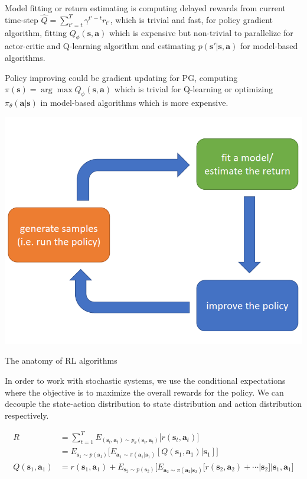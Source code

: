 \documentclass{tufte-handout}
\newcommand{\s}{\mathbf{s}}
\newcommand{\act}{\mathbf{a}}
\begin{document}
Model fitting or return estimating is computing delayed rewards from current time-step $\hat{Q}=\sum_{t'=t}^T \gamma ^{t'-t} r_{t'} $, which is trivial and fast, for policy gradient algorithm, fitting $Q_\phi(\s, \act) $ which is expensive but non-trivial to parallelize for actor-critic and Q-learning algorithm and estimating $p(\s' | \s, \act) $ for model-based algorithms.

Policy improving could be gradient updating for PG, computing $\pi(\s) = \arg \max Q_\phi (\s, \act)$ which is trivial for Q-learning or optimizing $\pi_\theta(\act | \s) $ in model-based algorithms which is more expensive.

\begin{marginfigure}
  \centering
  \includegraphics[width=\linewidth]{anatomy}
  \caption{The anatomy of RL algorithms}
  \label{fig:anatomy}
\end{marginfigure}

In order to work with stochastic systems, we use the conditional expectations where the objective is to maximize the overall rewards for the policy. We can decouple the state-action distribution to state distribution and action distribution respectively.

\begin{align*}
R & = \sum_{t=1} ^ T E_{(\s_t, \act_t)\sim p_\theta (\s_t, \act_t)} \big[r(\s_t, \act_t) \big] \\
  & = E_{\s_1 \sim p(\s_1)} \Big[E_{\act_1 \sim \pi(\act_1 | \s_1)} [Q(\s_1, \act_1) | \s_1] \Big] \\
Q(\s_1, \act_1) & = r(\s_1, \act_1) + E_{\s_2 \sim p(\s_2)} \Big[E_{\act_2 \sim \pi(\act_2 | \s_2)} [r(\s_2, \act_2) + \cdots | \s_2] | \s_1, \act_1 \Big]
\end{align*}
\end{document}
